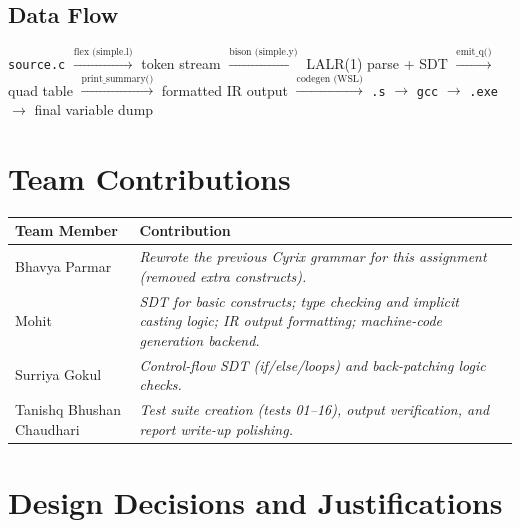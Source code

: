 \documentclass[11pt]{article}
\begin{document}
\subsection{Data Flow}

\begin{center}
\texttt{source.c}
$\xrightarrow{\text{flex (simple.l)}}$
token stream
$\xrightarrow{\text{bison (simple.y)}}$
LALR(1) parse + SDT
$\xrightarrow{\text{emit\_q()}}$
quad table
$\xrightarrow{\text{print\_summary()}}$
formatted IR output
$\xrightarrow{\text{codegen (WSL)}}$
\texttt{.s} $\rightarrow$ \texttt{gcc} $\rightarrow$ \texttt{.exe} $\rightarrow$ final variable dump
\end{center}

\section{Team Contributions}

\begin{center}
\renewcommand{\arraystretch}{1.5}
\begin{tabularx}{\textwidth}{@{}lX@{}}
\toprule
\textbf{Team Member} & \textbf{Contribution} \\
\midrule
Bhavya Parmar & \textit{Rewrote the previous Cyrix grammar for this assignment (removed extra constructs).} \\[0.5cm]
Mohit & \textit{SDT for basic constructs; type checking and implicit casting logic; IR output formatting; machine-code generation backend.} \\[0.5cm]
Surriya Gokul & \textit{Control-flow SDT (if/else/loops) and back-patching logic checks.} \\[0.5cm]
Tanishq Bhushan Chaudhari & \textit{Test suite creation (tests 01--16), output verification, and report write-up polishing.} \\
\bottomrule
\end{tabularx}
\end{center}

\section{Design Decisions and Justifications}
\end{document}
